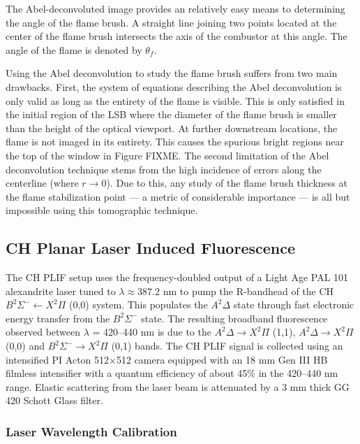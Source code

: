 The Abel-deconvoluted image provides an relatively easy means to determining the angle of the flame brush.
A straight line joining two points located at the center of the flame brush intersects the axis of the combustor at this angle.
The angle of the flame is denoted by \(\theta_f\).

Using the Abel deconvolution to study the flame brush suffers from two main drawbacks.
First, the system of equations describing the Abel deconvolution is only valid as long as the entirety of the flame is visible.
This is only satisfied in the initial region of the LSB where the diameter of the flame brush is smaller than the height of the optical viewport.
At further downstream locations, the flame is not imaged in its entirety.
This causes the spurious bright regions near the top of the window in Figure FIXME.
The second limitation of the Abel deconvolution technique stems from the high incidence of errors along the centerline (where \(r \to 0\)).
Due to this, any study of the flame brush thickness at the flame stabilization point --- a metric of considerable importance --- is all but impossible using this tomographic technique.

\subsection{CH Planar Laser Induced Fluorescence}

The CH PLIF setup uses the frequency-doubled output of a Light Age PAL 101 alexandrite laser tuned to \(\lambda \approx 387.2\) nm to pump the R-bandhead of the CH \(B^2\Sigma^- \leftarrow X^2\Pi\) (0,0) system.
This populates the \(A^2\Delta\) state through fast electronic energy transfer from the \(B^2\Sigma^-\) state.
The resulting broadband fluorescence observed between \(\lambda\) = 420--440 nm is due to the \(A^2\Delta \rightarrow X^2\Pi\) (1,1), \(A^2\Delta \rightarrow X^2\Pi\) (0,0) and \(B^2\Sigma^- \rightarrow X^2\Pi\) (0,1) bands.
The CH PLIF signal is collected using an intensified PI Acton 512\(\times\)512 camera equipped with an 18 mm Gen III HB filmless intensifier with a quantum efficiency of about 45\% in the 420--440 nm range.
Elastic scattering from the laser beam is attenuated by a 3 mm thick GG 420 Schott Glass filter.

\subsubsection{Laser Wavelength Calibration}

